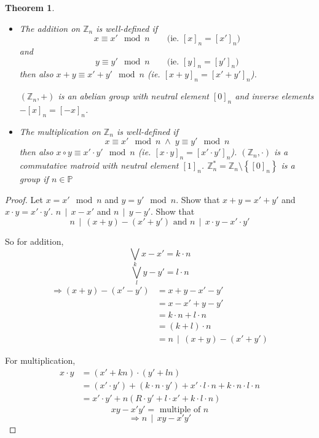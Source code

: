 \documentclass[a4paper,landscape,twocolumn]{article}
\newcommand\set[1]{\left\{#1\right\}}
\newcommand\divides[2]{#1\,\mid\,#2}
\newtheorem{theorem}{Theorem}[section]
\begin{document}
\begin{theorem}
  \label{Satz-2.16}
  \begin{itemize}
    \item[(i)] The addition on $\mathbb{Z}_n$ is well-defined if
      \[ x \equiv x' \mod{n} \qquad \text{(ie. $[x]_n = [x']_n)$} \]
      and
      \[ y \equiv y' \mod{n} \qquad \text{(ie. $[y]_n = [y']_n)$} \]
      then also $x + y \equiv x' + y' \mod{n}$ (ie. $[x+y]_n = [x' + y']_n$).

      $(\mathbb{Z}_n, +)$ is an abelian group with neutral element $[0]_n$
      and inverse elements $-[x]_n = [-x]_n$.
    \item[(ii)] The multiplication on $\mathbb{Z}_n$ is well-defined if
      \[ x \equiv x' \mod{n}  \;\land\; y \equiv y' \mod{n} \]
      then also $x \circ y \equiv x' \cdot y' \mod{n}$ (ie. $[x\cdot y]_n = [x'\cdot y']_n$).
      $(\mathbb{Z}_n, \cdot)$ is a commutative matroid with neutral element $[1]_n$.
      $\mathbb{Z}_n^* = \mathbb{Z}_n \setminus \set{[0]_n}$ is a group if $n \in \mathbb{P}$
  \end{itemize}
\end{theorem}

\begin{proof}
  Let $x = x' \mod{n}$ and $y = y' \mod{n}$. Show that $x + y = x' + y'$ and $x\cdot y = x' \cdot y'$.
  $\divides{n}{x-x'}$ and $\divides{n}{y - y'}$. Show that
  \[ \divides{n}{(x+y) - (x' + y')} \text{ and } \divides{n}{x\cdot y - x'\cdot y'} \]

  So for addition,
  \[ \bigvee_k x - x' = k \cdot n \]
  \[ \bigvee_l y - y' = l \cdot n \]
  \begin{align*}
    \Rightarrow (x + y) - (x' - y')
      &= x + y - x' - y' \\
      &= x - x' + y - y' \\
      &= k \cdot n + l \cdot n \\
      &= (k + l) \cdot n \\
      &= \divides{n}{(x + y) - (x' + y')}
  \end{align*}

  For multiplication,
  \begin{align*}
    x \cdot y
      &= (x' + kn) \cdot (y' + ln) \\
      &= (x' \cdot y') + (k \cdot n \cdot y') + x' \cdot l \cdot n + k \cdot n \cdot l \cdot n \\
      &= x' \cdot y' + n (R\cdot y' + l \cdot x' + k \cdot l \cdot n)
  \end{align*}
  \[ xy - x' y' = \text{ multiple of } n \]
  \[ \Rightarrow \divides{n}{xy - x'y'} \]
\end{proof}
\end{document}
